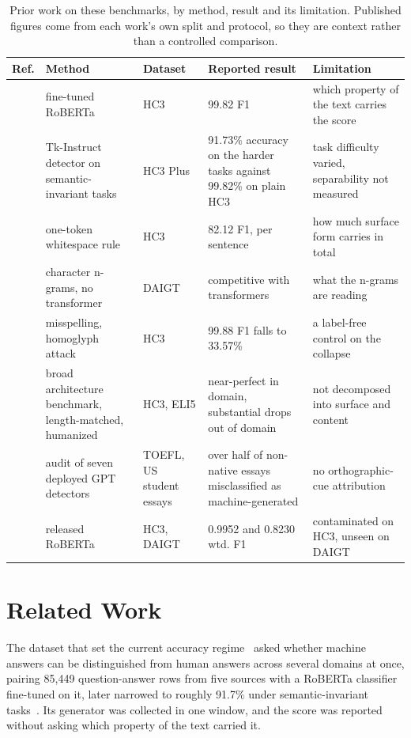 \documentclass[conference,a4paper]{IEEEtran}
\begin{document}
\begin{table}[!t]
\centering
\caption{Prior work on these benchmarks, by method, result and its limitation. Published figures come from each work's own split and protocol, so they are context rather than a controlled comparison.}
\label{tab:relatedwork}
\scriptsize
\setlength{\tabcolsep}{4pt}
\begin{tabularx}{\textwidth}{@{}lp{3.4cm}p{1.9cm}XX@{}}
\toprule
Ref. & Method & Dataset & Reported result & Limitation \\
\midrule
\cite{Guo2023close} & fine-tuned RoBERTa & HC3 & 99.82 F1 & which property of the text carries the score \\
\cite{Su2023plus} & Tk-Instruct detector on semantic-invariant tasks & HC3 Plus & 91.73\% accuracy on the harder tasks against 99.82\% on plain HC3 & task difficulty varied, separability not measured \\
\cite{Tian2023multiscale} & one-token whitespace rule & HC3 & 82.12 F1, per sentence & how much surface form carries in total \\
\cite{Zhou2024exploiting} & character n-grams, no transformer & DAIGT & competitive with transformers & what the n-grams are reading \\
\cite{Antoun2023towards} & misspelling, homoglyph attack & HC3 & 99.88 F1 falls to 33.57\% & a label-free control on the collapse \\
\cite{Baidya2026detecting} & broad architecture benchmark, length-matched, humanized & HC3, ELI5 & near-perfect in domain, substantial drops out of domain & not decomposed into surface and content \\
\cite{Liang2023gpt} & audit of seven deployed GPT detectors & TOEFL, US student essays & over half of non-native essays misclassified as machine-generated & no orthographic-cue attribution \\
\cite{HelloSimpleAI2023detector} & released RoBERTa & HC3, DAIGT & 0.9952 and 0.8230 wtd. F1 & contaminated on HC3, unseen on DAIGT \\
\bottomrule
\end{tabularx}
\end{table}

\section{Related Work}
\label{sec:related}

The dataset that set the current accuracy regime~\cite{Guo2023close} asked whether machine answers can be distinguished from human answers across several domains at once, pairing 85,449 question-answer rows from five sources with a RoBERTa classifier fine-tuned on it, later narrowed to roughly 91.7\% under semantic-invariant tasks~\cite{Su2023plus}. Its generator was collected in one window, and the score was reported without asking which property of the text carried it.
\end{document}
